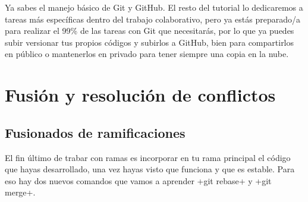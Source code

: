 \documentclass[a5paper, oneside,10pt]{article}
\begin{document}
    Ya sabes el manejo básico de Git y GitHub. El resto del tutorial lo dedicaremos a tareas más específicas dentro del trabajo colaborativo, pero ya estás preparado/a para realizar el 99\% de las tareas con Git que necesitarás, por lo que ya puedes subir versionar tus propios códigos  y subirlos a GitHub, bien para compartirlos en público o mantenerlos en privado para tener siempre una copia en la nube.

  \section{Fusión y resolución de conflictos}
  \subsection{Fusionados de ramificaciones}
    El fin último de trabar con ramas es incorporar en tu rama principal el código que hayas desarrollado, una vez hayas visto que funciona y que es estable. Para eso hay dos nuevos comandos que vamos a aprender \cverb+git rebase+ y \cverb+git merge+.
    
\end{document}
